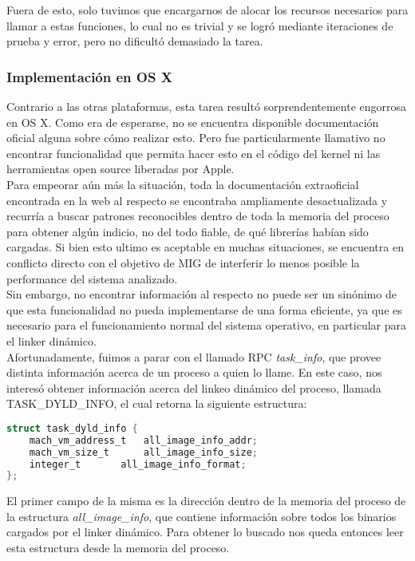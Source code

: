 Fuera de esto, solo tuvimos que encargarnos de alocar los recursos necesarios
para llamar a estas funciones, lo cual no es trivial y se logró mediante
iteraciones de prueba y error, pero no dificultó demasiado la tarea.\\

\subsubsection{Implementación en OS X}

Contrario a las otras plataformas, esta tarea resultó sorprendentemente
engorrosa en OS X. Como era de esperarse, no se encuentra disponible
documentación oficial alguna sobre cómo realizar esto. Pero fue particularmente
llamativo no encontrar funcionalidad que permita hacer esto en el código del
kernel ni las herramientas open source liberadas por Apple.\\

Para empeorar aún más la situación, toda la documentación extraoficial
encontrada en la web al respecto se encontraba ampliamente desactualizada y
recurría a buscar patrones reconocibles dentro de toda la memoria del proceso
para obtener algún indicio, no del todo fiable, de qué librerías habían sido
cargadas. Si bien esto ultimo es aceptable en muchas situaciones, se encuentra
en conflicto directo con el objetivo de MIG de interferir lo menos posible la
performance del sistema analizado.\\

Sin embargo, no encontrar información al respecto no puede ser un sinónimo de
que esta funcionalidad no pueda implementarse de una forma eficiente, ya que es
necesario para el funcionamiento normal del sistema operativo, en particular
para el linker dinámico.\\

Afortunadamente, fuimos a parar con el llamado RPC \textit{task\_info}, que
provee distinta información acerca de un proceso a quien lo llame. En este
caso, nos interesó obtener información acerca del linkeo dinámico del proceso,
llamada TASK\_DYLD\_INFO, el cual retorna la siguiente estructura:

\begin{lstlisting}[language=C]
struct task_dyld_info {
	mach_vm_address_t	all_image_info_addr;
	mach_vm_size_t		all_image_info_size;
	integer_t 		all_image_info_format;
};
\end{lstlisting}

\noindent El primer campo de la misma es la dirección dentro de la memoria del
proceso de la estructura \textit{all\_image\_info}, que contiene información
sobre todos los binarios cargados por el linker dinámico. Para obtener lo
buscado nos queda entonces leer esta estructura desde la memoria del proceso.\\

